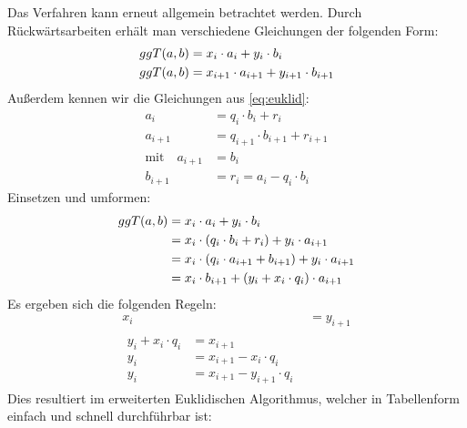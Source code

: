\noindent
Das Verfahren kann erneut allgemein betrachtet werden. Durch Rückwärtsarbeiten erhält
man verschiedene Gleichungen der folgenden Form:
\begin{align*}
  ggT(a,b) & = x_i \cdot a_i + y_i \cdot b_i                 \\
  ggT(a,b) & = x_{i+1} \cdot a_{i+1} + y_{i+1} \cdot b_{i+1}
\end{align*}
Außerdem kennen wir die Gleichungen aus \eqref{eq:euklid}:
\begin{align*}
  a_i                      & = q_i \cdot b_i + r_i             \\
  a_{i+1}                  & = q_{i+1} \cdot b_{i+1} + r_{i+1} \\
  \text{mit} \quad a_{i+1} & = b_i                             \\
  b_{i+1}                  & = r_i = a_i - q_i \cdot b_i
\end{align*}
Einsetzen und umformen:
\begin{align*}
  ggT(a,b) & = x_i \cdot a_i + y_i \cdot b_i                               \\
             & = x_i \cdot (q_i \cdot b_i + r_i) + y_i \cdot a_{i+1}         \\
             & = x_i \cdot (q_i \cdot a_{i+1} + b_{i+1}) + y_i \cdot a_{i+1} \\
             & = x_i \cdot b_{i+1} + (y_i + x_i \cdot q_i) \cdot a_{i+1}
\end{align*}
Es ergeben sich die folgenden Regeln:
\begin{align}
  x_i & = y_{i+1} \\
  \begin{split}
    y_i + x_i \cdot q_i &= x_{i+1} \\
    y_i &= x_{i+1} - x_i \cdot q_i \\
    y_i &= x_{i+1} - y_{i+1} \cdot q_i
  \end{split}
\end{align}
Dies resultiert im erweiterten Euklidischen Algorithmus, welcher in Tabellenform
einfach und schnell durchführbar ist:
\newpage

